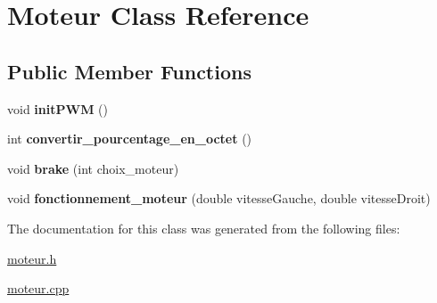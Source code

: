 \hypertarget{class_moteur}{}\section{Moteur Class Reference}
\label{class_moteur}
\subsection*{Public Member Functions}
\begin{DoxyCompactItemize}
\item 
void {\bfseries init\+P\+WM} ()\hypertarget{class_moteur_a89e10e5be14072650f37037ffd912fd0}{}\label{class_moteur_a89e10e5be14072650f37037ffd912fd0}

\item 
int {\bfseries convertir\+\_\+pourcentage\+\_\+en\+\_\+octet} ()\hypertarget{class_moteur_a455ceec5ff8d7d51f8a823259762131c}{}\label{class_moteur_a455ceec5ff8d7d51f8a823259762131c}

\item 
void {\bfseries brake} (int choix\+\_\+moteur)\hypertarget{class_moteur_a94ce68461266cf4cf7fa85ed004454e0}{}\label{class_moteur_a94ce68461266cf4cf7fa85ed004454e0}

\item 
void {\bfseries fonctionnement\+\_\+moteur} (double vitesse\+Gauche, double vitesse\+Droit)\hypertarget{class_moteur_aa637ddd3e6ad5878e39d251db62b6862}{}\label{class_moteur_aa637ddd3e6ad5878e39d251db62b6862}

\end{DoxyCompactItemize}


The documentation for this class was generated from the following files\+:\begin{DoxyCompactItemize}
\item 
\hyperlink{moteur_8h}{moteur.\+h}\item 
\hyperlink{moteur_8cpp}{moteur.\+cpp}\end{DoxyCompactItemize}
